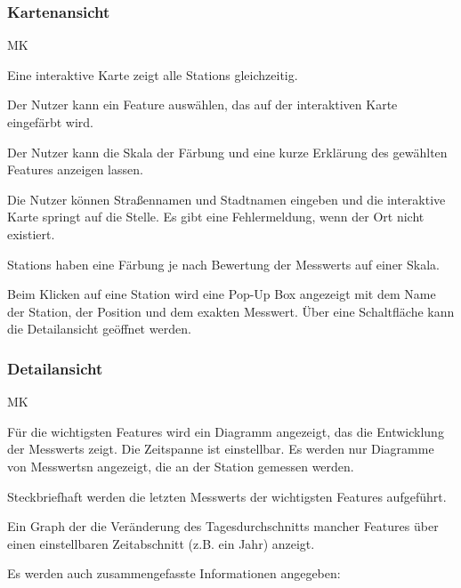 \subsubsection*{\gls{Kartenansicht}}
\begin{Kriterien}{MK}
	\item Eine interaktive Karte zeigt alle \glspl{Station} gleichzeitig. 
	
	\item Der Nutzer kann ein \gls{Feature} auswählen, das auf der interaktiven Karte eingefärbt wird.
	
	\item Der Nutzer kann die Skala der Färbung und eine kurze Erklärung des gewählten \gls{Feature}s anzeigen lassen.
	
	\item Die Nutzer können Straßennamen und Stadtnamen eingeben und die interaktive Karte springt auf die Stelle. Es gibt eine Fehlermeldung, wenn der Ort nicht existiert.

	\item \glspl{Station} haben eine Färbung je nach Bewertung der \glspl{Messwert} auf einer Skala.
	
	\item Beim Klicken auf eine \gls{Station} wird eine \gls{Pop-Up} Box angezeigt mit dem Name der Station, der Position und dem exakten \gls{Messwert}.
		Über eine Schaltfläche kann die \gls{Detailansicht} geöffnet werden. 
\end{Kriterien}

\subsubsection*{\gls{Detailansicht}}
\begin{Kriterien}{MK}
	\item Für die wichtigsten \glspl{Feature} wird ein Diagramm angezeigt, das die Entwicklung der \glspl{Messwert} zeigt. Die Zeitspanne ist einstellbar. Es werden nur Diagramme von \glspl{Messwert}n angezeigt, die an der \gls{Station} gemessen werden.
	
	\item Steckbriefhaft werden die letzten \glspl{Messwert} der wichtigsten \glspl{Feature} aufgeführt.

	\item Ein \gls{Graph} der die Veränderung des Tagesdurchschnitts mancher \glspl{Feature} über einen einstellbaren Zeitabschnitt (z.B. ein Jahr) anzeigt.
	
	\item Es werden auch zusammengefasste Informationen angegeben: 
\end{Kriterien}
		
